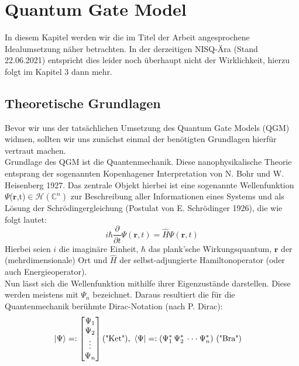 
\section{Quantum Gate Model}
\label{sec:qgmc}
In diesem Kapitel werden wir die im Titel der Arbeit angesprochene Idealumsetzung näher betrachten. In der derzeitigen NISQ-Ära (Stand 22.06.2021) entspricht dies leider noch überhaupt nicht der Wirklichkeit, hierzu folgt im Kapitel 3 dann mehr.
\subsection{Theoretische Grundlagen}
Bevor wir uns der tatsächlichen Umsetzung des Quantum Gate Models (QGM) widmen, sollten wir uns zunächst einmal der benötigten Grundlagen hierfür vertraut machen.\\
Grundlage des QGM ist die Quantenmechanik. Diese nanophysikalische Theorie entsprang der sogenannten Kopenhagener Interpretation von N. Bohr und W. Heisenberg 1927\cite[Seiten 108-111]{KopoBaker}.
Das zentrale Objekt hierbei ist eine sogenannte Wellenfunktion \(\Psi\)(\(\mathbf{r}\),t)\(\in \mathcal{H}(\mathbb{C}^n)\) zur Beschreibung aller Informationen eines Systems und als Lösung der Schrödingergleichung (Postulat von E. Schrödinger 1926), die wie folgt lautet\cite[Seite 22]{GriffithsQuantumMechanics}:
\begin{equation}
i \hbar \frac{\partial}{\partial t}\Psi(\mathbf{r},t) = \hat H \Psi(\mathbf{r},t)
\end{equation}
Hierbei seien \(i\) die imaginäre Einheit, \(\hbar\) das plank'sche Wirkungsquantum, \(\mathbf{r}\) der (mehrdimensionale) Ort und \( \hat H\) der selbst-adjungierte Hamiltonoperator (oder auch Energieoperator).\\
Nun lässt sich die Wellenfunktion mithilfe ihrer Eigenzustände darstellen. Diese werden meistens mit \(\Psi_n\) bezeichnet. Daraus resultiert die für die Quantenmechanik berühmte Dirac-Notation (nach P. Dirac)\cite[Seite 154]{GriffithsQuantumMechanics}:
\begin{align}
\ket{\Psi} &=: \begin{bmatrix}
           \Psi_{1} \\
           \Psi_{2} \\
           \vdots \\
           \Psi_{n}
         \end{bmatrix}
\text{("Ket"), } 
\bra{\Psi} =: (\Psi_{1}^* \,\Psi_{2}^*\, \cdot\cdot\cdot \Psi_{n}^*) \text{ ("Bra")}
\end{align}
